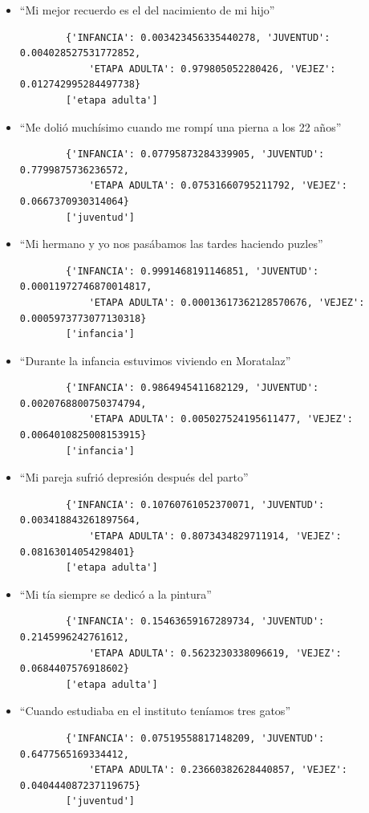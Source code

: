 \begin{itemize}
	\item ``Mi mejor recuerdo es el del nacimiento de mi hijo''
	\begin{verbatim}
		{'INFANCIA': 0.003423456335440278, 'JUVENTUD': 0.004028527531772852, 
			'ETAPA ADULTA': 0.979805052280426, 'VEJEZ': 0.012742995284497738}
		['etapa adulta']
	\end{verbatim}
	\item ``Me dolió muchísimo cuando me rompí una pierna a los 22 años''
	\begin{verbatim}
		{'INFANCIA': 0.07795873284339905, 'JUVENTUD': 0.7799875736236572, 
			'ETAPA ADULTA': 0.07531660795211792, 'VEJEZ': 0.0667370930314064}
		['juventud']
	\end{verbatim}
	\item ``Mi hermano y yo nos pasábamos las tardes haciendo puzles''
	\begin{verbatim}
		{'INFANCIA': 0.9991468191146851, 'JUVENTUD': 0.00011972746870014817, 
			'ETAPA ADULTA': 0.00013617362128570676, 'VEJEZ': 0.0005973773077130318}
		['infancia']
	\end{verbatim}
	\item ``Durante la infancia estuvimos viviendo en Moratalaz''
	\begin{verbatim}
		{'INFANCIA': 0.9864945411682129, 'JUVENTUD': 0.0020768800750374794, 
			'ETAPA ADULTA': 0.005027524195611477, 'VEJEZ': 0.0064010825008153915}
		['infancia']
	\end{verbatim}
	\item ``Mi pareja sufrió depresión después del parto''
	\begin{verbatim}
		{'INFANCIA': 0.10760761052370071, 'JUVENTUD': 0.003418843261897564, 
			'ETAPA ADULTA': 0.8073434829711914, 'VEJEZ': 0.08163014054298401}
		['etapa adulta']
	\end{verbatim}
	\item ``Mi tía siempre se dedicó a la pintura''
	\begin{verbatim}
		{'INFANCIA': 0.15463659167289734, 'JUVENTUD': 0.2145996242761612, 
			'ETAPA ADULTA': 0.5623230338096619, 'VEJEZ': 0.0684407576918602}
		['etapa adulta']
	\end{verbatim}
	\item ``Cuando estudiaba en el instituto teníamos tres gatos''
	\begin{verbatim}
		{'INFANCIA': 0.07519558817148209, 'JUVENTUD': 0.6477565169334412, 
			'ETAPA ADULTA': 0.23660382628440857, 'VEJEZ': 0.040444087237119675}
		['juventud']
	\end{verbatim}
	
\end{itemize}

